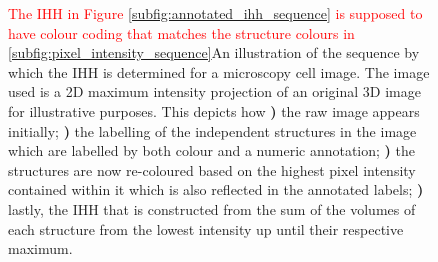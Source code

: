 \begin{figure}
    \caption[An illustration of the sequence by which the IHH is determined for a cell image]{\textcolor{red}{The IHH in Figure \ref{subfig:annotated_ihh_sequence} is supposed to have colour coding that matches the structure colours in \ref{subfig:pixel_intensity_sequence}}An illustration of the sequence by which the IHH is determined for a microscopy cell image. The image used is a 2D maximum intensity projection of an original 3D image for illustrative purposes. This depicts how \textbf{)} the raw image appears initially; \textbf{)} the labelling of the independent structures in the image which are labelled by both colour and a numeric annotation; \textbf{)} the structures are now re-coloured based on the highest pixel intensity contained within it which is also reflected in the annotated labels; \textbf{)} lastly, the IHH that is constructed from the sum of the volumes of each structure from the lowest intensity up until their respective maximum.}
    \label{fig:ihh_sequence}
\end{figure}
